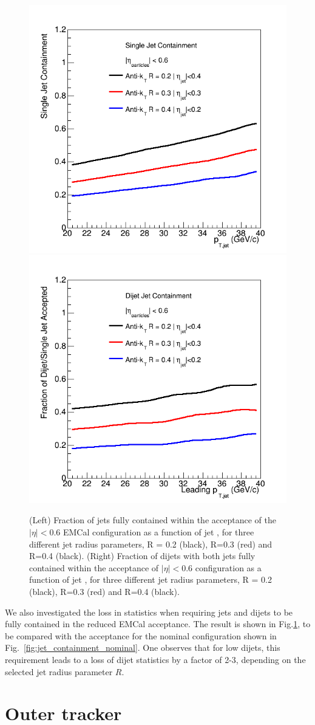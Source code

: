 \begin{figure}[hbt]
  \centering
  \includegraphics[width=0.4\linewidth]{figs/SingleJet_eta_ecal06}
  \hspace{0.1\linewidth}  \includegraphics[width=0.4\linewidth]{figs/Dijet_eta_ecal06}
  \caption{(Left)
  Fraction of jets fully contained within the acceptance of the $|\eta| < 0.6$ EMCal configuration as a function
  of jet \pt, for three different jet radius parameters, R = 0.2 (black), R=0.3 (red) and R=0.4 (black).
   (Right)
  Fraction of dijets with both jets fully contained within the acceptance of $|\eta| < 0.6$ configuration as a function
  of jet \pt, for three different jet radius parameters, R = 0.2 (black), R=0.3 (red) and R=0.4 (black).}
  \label{fig:jet_containment_reduced_emcal}
\end{figure}

We also investigated the loss in statistics when requiring jets and dijets to be fully contained in the reduced EMCal acceptance. The result is shown 
in Fig.\ref{fig:jet_containment_reduced_emcal}, to be compared with the acceptance for the nominal 
configuration shown in Fig.~\ref{fig:jet_containment_nominal}. One observes that for low \pt dijets, this requirement leads to a loss of dijet
statistics by a factor of 2-3, depending on the selected jet radius parameter $R$.

\section{Outer tracker}

